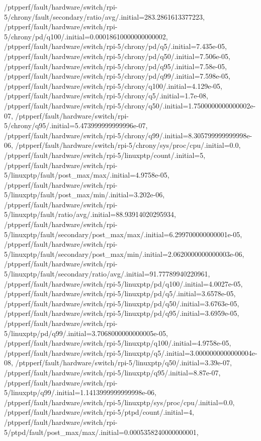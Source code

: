 {    /ptpperf/fault/hardware/switch/rpi-5/chrony/fault/secondary/ratio/avg/.initial=283.2861613377223,
    /ptpperf/fault/hardware/switch/rpi-5/chrony/pd/q100/.initial=0.00018610000000000002,
    /ptpperf/fault/hardware/switch/rpi-5/chrony/pd/q5/.initial=7.435e-05,
    /ptpperf/fault/hardware/switch/rpi-5/chrony/pd/q50/.initial=7.506e-05,
    /ptpperf/fault/hardware/switch/rpi-5/chrony/pd/q95/.initial=7.58e-05,
    /ptpperf/fault/hardware/switch/rpi-5/chrony/pd/q99/.initial=7.598e-05,
    /ptpperf/fault/hardware/switch/rpi-5/chrony/q100/.initial=4.129e-05,
    /ptpperf/fault/hardware/switch/rpi-5/chrony/q5/.initial=1.7e-08,
    /ptpperf/fault/hardware/switch/rpi-5/chrony/q50/.initial=1.7500000000000002e-07,
    /ptpperf/fault/hardware/switch/rpi-5/chrony/q95/.initial=5.473999999999996e-07,
    /ptpperf/fault/hardware/switch/rpi-5/chrony/q99/.initial=8.305799999999998e-06,
    /ptpperf/fault/hardware/switch/rpi-5/chrony/sys/proc/cpu/.initial=0.0,
    /ptpperf/fault/hardware/switch/rpi-5/linuxptp/count/.initial=5,
    /ptpperf/fault/hardware/switch/rpi-5/linuxptp/fault/post_max/max/.initial=4.9758e-05,
    /ptpperf/fault/hardware/switch/rpi-5/linuxptp/fault/post_max/min/.initial=3.202e-06,
    /ptpperf/fault/hardware/switch/rpi-5/linuxptp/fault/ratio/avg/.initial=88.93914020295934,
    /ptpperf/fault/hardware/switch/rpi-5/linuxptp/fault/secondary/post_max/max/.initial=6.299700000000001e-05,
    /ptpperf/fault/hardware/switch/rpi-5/linuxptp/fault/secondary/post_max/min/.initial=2.0620000000000003e-06,
    /ptpperf/fault/hardware/switch/rpi-5/linuxptp/fault/secondary/ratio/avg/.initial=91.77789940220961,
    /ptpperf/fault/hardware/switch/rpi-5/linuxptp/pd/q100/.initial=4.0027e-05,
    /ptpperf/fault/hardware/switch/rpi-5/linuxptp/pd/q5/.initial=3.6578e-05,
    /ptpperf/fault/hardware/switch/rpi-5/linuxptp/pd/q50/.initial=3.6763e-05,
    /ptpperf/fault/hardware/switch/rpi-5/linuxptp/pd/q95/.initial=3.6959e-05,
    /ptpperf/fault/hardware/switch/rpi-5/linuxptp/pd/q99/.initial=3.7068000000000005e-05,
    /ptpperf/fault/hardware/switch/rpi-5/linuxptp/q100/.initial=4.9758e-05,
    /ptpperf/fault/hardware/switch/rpi-5/linuxptp/q5/.initial=3.0000000000000004e-08,
    /ptpperf/fault/hardware/switch/rpi-5/linuxptp/q50/.initial=3.39e-07,
    /ptpperf/fault/hardware/switch/rpi-5/linuxptp/q95/.initial=8.87e-07,
    /ptpperf/fault/hardware/switch/rpi-5/linuxptp/q99/.initial=1.1413999999999998e-06,
    /ptpperf/fault/hardware/switch/rpi-5/linuxptp/sys/proc/cpu/.initial=0.0,
    /ptpperf/fault/hardware/switch/rpi-5/ptpd/count/.initial=4,
    /ptpperf/fault/hardware/switch/rpi-5/ptpd/fault/post_max/max/.initial=0.0005358240000000001,
}
